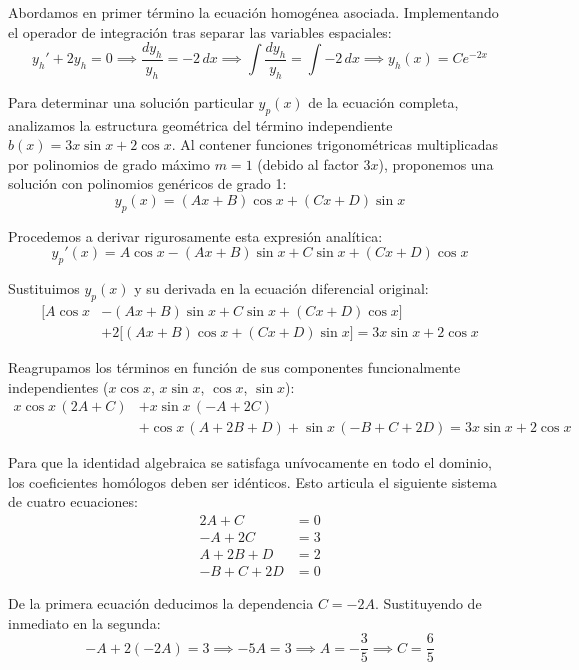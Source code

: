 \documentclass[11pt,a4paper]{article}
\theoremstyle{definition}
\theoremstyle{plain}
\begin{document}
\begin{tcolorbox}
Abordamos en primer término la ecuación homogénea asociada. Implementando el operador de integración tras separar las variables espaciales:
$$ y_h' + 2y_h = 0 \implies \frac{dy_h}{y_h} = -2\,dx \implies \int \frac{dy_h}{y_h} = \int -2\,dx \implies y_h(x) = C e^{-2x} $$

Para determinar una solución particular $y_p(x)$ de la ecuación completa, analizamos la estructura geométrica del término independiente $b(x) = 3x \sin x + 2\cos x$. Al contener funciones trigonométricas multiplicadas por polinomios de grado máximo $m=1$ (debido al factor $3x$), proponemos una solución con polinomios genéricos de grado 1:
$$ y_p(x) = (Ax + B)\cos x + (Cx + D)\sin x $$

Procedemos a derivar rigurosamente esta expresión analítica:
$$ y_p'(x) = A\cos x - (Ax + B)\sin x + C\sin x + (Cx + D)\cos x $$

Sustituimos $y_p(x)$ y su derivada en la ecuación diferencial original:
\begin{align*}
    \big[ A\cos x &- (Ax + B)\sin x + C\sin x + (Cx + D)\cos x \big] \\
    &+ 2\big[ (Ax + B)\cos x + (Cx + D)\sin x \big] = 3x \sin x + 2\cos x
\end{align*}

Reagrupamos los términos en función de sus componentes funcionalmente independientes ($x\cos x$, $x\sin x$, $\cos x$, $\sin x$):
\begin{align*}
    x\cos x \, (2A + C) &+ x\sin x \, (-A + 2C) \\
    &+ \cos x \, (A + 2B + D) + \sin x \, (-B + C + 2D) = 3x \sin x + 2\cos x
\end{align*}

Para que la identidad algebraica se satisfaga unívocamente en todo el dominio, los coeficientes homólogos deben ser idénticos. Esto articula el siguiente sistema de cuatro ecuaciones:
\begin{align*}
    2A + C &= 0 \\
    -A + 2C &= 3 \\
    A + 2B + D &= 2 \\
    -B + C + 2D &= 0
\end{align*}

De la primera ecuación deducimos la dependencia $C = -2A$. Sustituyendo de inmediato en la segunda:
$$ -A + 2(-2A) = 3 \implies -5A = 3 \implies A = -\frac{3}{5} \implies C = \frac{6}{5} $$


\end{tcolorbox}
\end{document}
